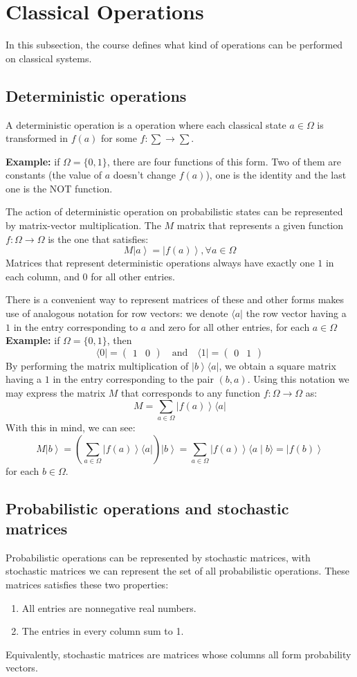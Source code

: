 \documentclass[12pt]{article} %
\newcommand{\ket}[1]{\left|#1\right\rangle}
\newcommand{\bra}[1]{\langle #1 \rvert}
\newcommand{\braket}[2]{\langle #1 \mid #2 \rangle}
\begin{document}
\section{Classical Operations}
In this subsection, the course defines what kind of operations can be performed on classical systems.

\subsection{Deterministic operations}
A deterministic operation is a operation where each classical state $a \in \Omega$ is transformed in $f(a)$ for some $f: \sum \rightarrow \sum$.

\textbf{Example:} if $\Omega = \{0, 1\}$, there are four functions of this form. Two of them are constants (the value of $a$ doesn't change $f(a)$), one is the identity and the last one is the NOT function. 

The action of deterministic operation on probabilistic states can be represented by matrix-vector multiplication. The $M$ matrix that represents a given function $f: \Omega \rightarrow \Omega$ is the one that satisfies:
$$
M\ket{a} = \ket{f(a)}, \forall a \in \Omega
$$
Matrices that represent deterministic operations always have exactly one $1$ in each column, and $0$ for all other entries.

There is a convenient way to represent matrices of these and other forms makes use of analogous notation for row vectors: we denote $\bra{a}$ the row vector having a $1$ in the entry corresponding to $a$ and zero for all other entries, for each $a \in \Omega$
\textbf{Example:} if $\Omega = \{0, 1\}$, then
$$
\bra{0} = \begin{pmatrix} 1 & 0 \end{pmatrix} \quad \text{and} \quad \bra{1} = \begin{pmatrix} 0 & 1 \end{pmatrix}
$$
By performing the matrix multiplication of $\ket{b}\bra{a}$, we obtain a square matrix having a $1$ in the entry corresponding to the pair $(b,a)$. Using this notation we may express the matrix $M$ that corresponds to any function $f: \Omega \rightarrow \Omega$ as:
$$
M = \sum_{a\in\Omega}\ket{f(a)}\bra{a}
$$
With this in mind, we can see:
$$
M\ket{b} = (\sum_{a\in\Omega}\ket{f(a)}\bra{a})\ket{b} = \sum_{a\in\Omega}\ket{f(a)}\braket{a}{b} = \ket{f(b)}
$$
for each $b \in \Omega$.
\subsection{Probabilistic operations and stochastic matrices}
Probabilistic operations can be represented by stochastic matrices, with stochastic matrices we can represent the set of all probabilistic operations. These matrices satisfies these two properties:
\begin{enumerate}
  \item All entries are nonnegative real numbers.
  \item The entries in every column sum to 1. 
\end{enumerate}
Equivalently, stochastic matrices are matrices whose columns all form probability vectors.
\end{document}
